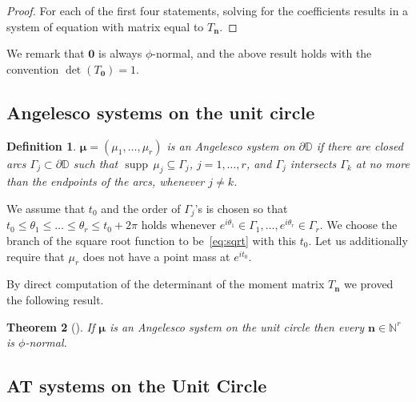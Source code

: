 \documentclass[reqno,centertags,11pt,draft]{amsart}
\newtheorem{thm}{Theorem}[section]
\newtheorem{rem}[thm]{Remark}
\newtheorem{defn}[thm]{Definition}
\newcommand{\N}{\mathbb{N}}
\newcommand{\T}{\mathbb{\partial\mathbb{D}}}
\newcommand{\D}{\mathbb{D}}
\renewcommand{\d}{\partial}
\newcommand{\supp}{\operatorname{supp}}
\begin{document}
\begin{proof}
    For each of the first four statements, solving for the coefficients results in a system of equation with matrix equal to $T_{\bm{n}}$. 
\end{proof}

We remark that $\bm{0}$ is always $\phi$-normal, and the above result holds with the convention $\det(T_{\bm{0}}) = 1$.


\subsection{Angelesco systems on the unit circle}\label{ss:Angelesco}
\begin{defn}\label{def:Angelesco}
    $\bm{\mu} = (\mu_1,\dots,\mu_r)$ is an Angelesco system on $\d\D$ if there are closed arcs $\Gamma_j\subset \T$ such that $\supp\,\mu_j\subseteq \Gamma_j$, $j = 1,\dots,r$, and $\Gamma_j$ intersects $\Gamma_k$ at no more than the endpoints of the arcs, whenever $j \neq k$.
\end{defn}
We assume that $t_0$ and the order of $\Gamma_j$'s is chosen so that $t_0 \le  \theta_1 \le \dots \le \theta_r \le t_0 + 2\pi$ holds whenever $e^{i\theta_1} \in \Gamma_1,\dots,e^{i\theta_r} \in \Gamma_r$. We choose the branch of the square root function to be~\eqref{eq:sqrt} with this  $t_0$. 
Let us additionally require that $\mu_r$ does not have a point mass at $e^{it_0}$.

By direct computation of the determinant of the moment matrix $T_{\bm{n}}$ we proved the following result. 

\begin{thm}[\cite{KVMLOPUC}]\label{thm:Angelesco}
    If $\bm{\mu}$ is an Angelesco system on the unit circle then every $\bm{n} \in \N^r$ is $\phi$-normal.
\end{thm}




\subsection{AT systems on the Unit Circle}\label{ss:AT}
\hfill\\
\end{document}
